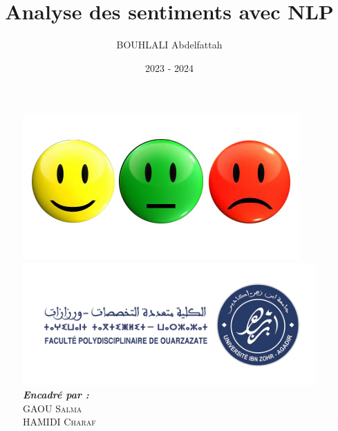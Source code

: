 \documentclass[10pt,hyperref={colorlinks,citecolor=blue,urlcolor=peking_blue,linkcolor=}]{beamer}
\author[BOUHLALI Abdelfattah]{BOUHLALI Abdelfattah}
\title{Analyse des sentiments avec NLP}
\subtitle{}
\institute{Master Mathématiques Appliquées pour la Science des Données}
\date{2023 - 2024}
\theoremstyle{plain}
\newif\ifplacelogo %
\begin{document}
{
\begin{frame}
    \titlepage
    \begin{figure}[htpb]
        \begin{center}
        
            \includegraphics[width=0.2\linewidth]{Figures/imogies.jpg}\\
            
            \includegraphics[width=0.3\linewidth]{Figures/fpo_logo.png} \\
            
            \emph{\textbf{Encadré par :}}\\ 
            \textsc{GAOU Salma} \\
            \textsc{HAMIDI Charaf}
            
        \end{center}
    \end{figure}
\end{frame}
}

\placelogofalse


%

%

%

%
\end{document}
